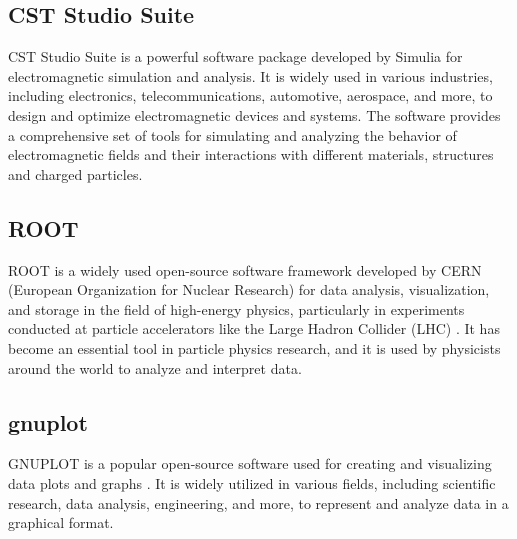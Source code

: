 \documentclass[a4paper,oneside,12pt]{report}
\numberwithin{equation}{chapter}
\begin{document}
\subsection{CST Studio Suite}
CST Studio Suite is a powerful software package developed by Simulia for electromagnetic simulation and analysis. It is widely used in various industries, including electronics, telecommunications, automotive, aerospace, and more, to design and optimize electromagnetic devices and systems. 
The software provides a comprehensive set of tools for simulating and analyzing the behavior of electromagnetic fields and their interactions with different materials, structures and charged particles.

\subsection{ROOT}
ROOT is a widely used open-source software framework developed by CERN (European Organization for Nuclear Research) for data analysis,
visualization, and storage in the field of high-energy physics, particularly in experiments conducted at particle accelerators 
like the Large Hadron Collider (LHC) \cite{root}. It has become an essential tool in particle physics research, 
and it is used by physicists around the world to analyze and interpret data.

\subsection{gnuplot}
GNUPLOT is a popular open-source software used for creating and visualizing data plots and graphs  \cite{gnuplot}. 
It is widely utilized in various fields, including scientific research, data analysis, engineering, and more, 
to represent and analyze data in a graphical format. 

\end{document}

